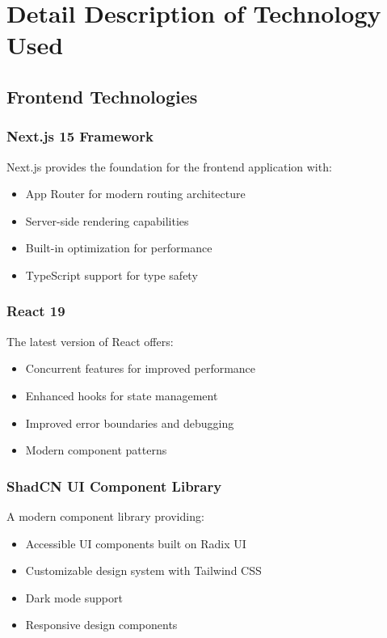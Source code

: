 \section{Detail Description of Technology Used}

\subsection{Frontend Technologies}

\subsubsection{Next.js 15 Framework}
Next.js provides the foundation for the frontend application with:
\begin{itemize}
    \item App Router for modern routing architecture
    \item Server-side rendering capabilities
    \item Built-in optimization for performance
    \item TypeScript support for type safety
\end{itemize}

\subsubsection{React 19}
The latest version of React offers:
\begin{itemize}
    \item Concurrent features for improved performance
    \item Enhanced hooks for state management
    \item Improved error boundaries and debugging
    \item Modern component patterns
\end{itemize}

\subsubsection{ShadCN UI Component Library}
A modern component library providing:
\begin{itemize}
    \item Accessible UI components built on Radix UI
    \item Customizable design system with Tailwind CSS
    \item Dark mode support
    \item Responsive design components
\end{itemize}

